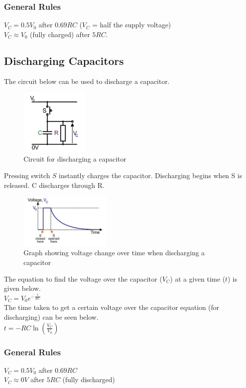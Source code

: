 \documentclass[a4paper,11pt, twocolumn]{article}
\begin{document}
\subsubsection{General Rules}
$V_C = 0.5V_0$ after $0.69RC$ ($V_C$ = half the supply voltage)\\
$V_C \approx V_0$ (fully charged) after $5RC$.

\subsection{Discharging Capacitors}
The circuit below can be used to discharge a capacitor.
\begin{figure}[H]
    \centering
    \includegraphics[width=0.3\textwidth]{images/dischargeCapacitor.jpg}
    \caption{Circuit for discharging a capacitor}
    \label{fig:dischargeCapacitor}
\end{figure}
\noindent Pressing switch $S$ instantly charges the capacitor. Discharging begins when S is released. C discharges through R.
\begin{figure}[H]
    \centering
    \includegraphics[width=0.4\textwidth]{images/dischargeCapGraph.jpg}
    \caption{Graph showing voltage change over time when discharging a capacitor}
    \label{fig:dischargeCapGraph}
\end{figure}
The equation to find the voltage over the capacitor ($V_C$) at a given time ($t$) is given below.\\
$\displaystyle V_C = V_0 e^{\displaystyle-\frac{t}{RC}}$\\
The time taken to get a certain voltage over the capacitor equation (for discharging) can be seen below.\\
$\displaystyle t=-RC \ln \left(\displaystyle \frac{V_C}{V_0}\right)$
\subsubsection{General Rules}
$V_C=0.5V_0$ after $0.69RC$\\
$V_C \approx 0V$ after $5RC$ (fully discharged)
\end{document}
